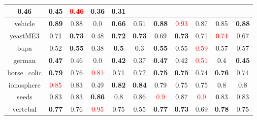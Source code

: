\documentclass{article}%
\begin{document}
\begin{tabular}{c|cccccccccc}
{0.46
}&0.45&\textcolor{red}{ 
0.46
}&\textbf{0.36}&0.31\\%
\hline%
vehicle&\textbf{0.89}&0.88&0.0&\textbf{0.66}&0.51&\textbf{0.88}&\textcolor{red}{ 
0.93
}&0.87&0.85&\textbf{0.88}\\%
\hline%
yeastME3&0.71&\textbf{0.73}&0.48&\textbf{0.72}&\textbf{0.73}&0.69&\textbf{0.73}&0.71&\textcolor{red}{ 
0.74
}&0.67\\%
\hline%
bupa&0.52&\textbf{0.55}&0.38&\textbf{0.5}&0.3&\textbf{0.55}&0.55&\textcolor{red}{ 
0.59
}&0.57&0.57\\%
\hline%
german&\textbf{0.47}&0.46&0.0&\textbf{0.42}&0.37&\textbf{0.47}&0.42&\textcolor{red}{ 
0.51
}&0.4&\textbf{0.45}\\%
\hline%
horse\_colic&\textbf{0.79}&0.76&\textcolor{red}{ 
0.81
}&0.71&0.72&\textbf{0.75}&\textbf{0.75}&0.74&\textbf{0.76}&0.74\\%
\hline%
ionosphere&\textcolor{red}{ 
0.85
}&0.83&0.49&\textbf{0.82}&\textbf{0.84}&0.79&0.75&0.75&0.8&0.8\\%
\hline%
seeds&0.83&0.83&\textbf{0.86}&0.8&0.86&\textcolor{red}{ 
0.9
}&0.87&\textcolor{red}{ 
0.9
}&0.83&0.83\\%
\hline%
vertebal&\textbf{0.77}&0.76&\textcolor{red}{ 
0.95
}&0.75&0.55&\textbf{0.77}&\textbf{0.73}&0.69&\textbf{0.78}&0.75\\%
\hline%
\end{tabular}

%
\end{document}
